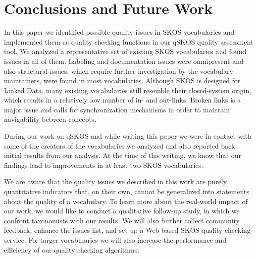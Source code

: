 \section{Conclusions and Future Work}\label{sec:conclusions}

In this paper we identified possible quality issues in SKOS vocabularies and implemented them as quality checking functions in our qSKOS quality assessment tool. We analyzed a representative set of existing SKOS vocabularies and found  issues in all of them. Labeling and documentation issues were omnipresent and also structural issues, which require further investigation by the vocabulary maintainers, were found in most vocabularies. Although SKOS is designed for Linked Data, many existing vocabularies still resemble their closed-system origin, which results in a relatively low number of in- and out-links. Broken links is a major issue and calls for synchronization mechanisms in order to maintain navigability between concepts.

During our work on qSKOS and while writing this paper we were in contact with some of the creators of the vocabularies we analyzed and also reported back initial results from our analysis. At the time of this writing, we know that our findings lead to improvements in at least two SKOS vocabularies.

We are aware that the quality issues we described in this work are purely quantitative indicators that, on their own, cannot be generalized into statements about the quality of a vocabulary. To learn more about the real-world impact of our work, we would like to conduct a qualitative follow-up study, in which we confront taxonomists with our results. We will also further collect community feedback, enhance the issues list, and set up a Web-based SKOS quality checking service. For larger vocabularies we will also increase the performance and efficiency of our quality checking algorithms.



